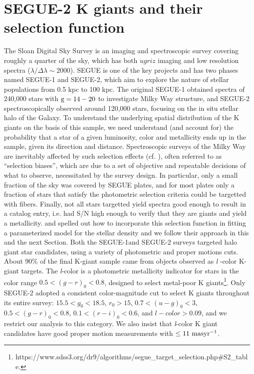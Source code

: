 \documentclass[12pt,preprint]{aastex}
\begin{document}
\section{SEGUE-2 K giants and their selection function}\label{sec:Sample_and_SelectionFunction}
The Sloan Digital Sky Survey\citep[SDSS;][]{York2000} is an imaging and spectroscopic survey covering roughly a quarter of the sky, which has both $ugriz$ imaging \citep{Fukugita1996, Gunn1998, Stoughton2002, Pier2003, Eisenstein2011} and low resolution spectra ($\lambda/\Delta \lambda \sim 2000$). SEGUE is one of
the key projects and has two phases named SEGUE-1 and SEGUE-2, which aim to explore the nature of stellar populations from 0.5 kpc to 100 kpc\citep[][and Rockosi et al. in prep.]{Yanny2009b}. The original SEGUE-1 obtained spectra of 240,000 stars with $\rm g=14-20$ to investigate Milky Way structure, and SEGUE-2 spectroscopically observed around 120,000 stars, focusing on the in situ stellar halo of the Galaxy.
To understand the underlying spatial distribution of the K giants on the basis of this sample, we need understand (and account for) the probability that a star of a given luminosity, color and metallicity ends up in the sample, given its direction and distance.
Spectroscopic surveys of the Milky Way are inevitably affected by such selection effects (cf. \citet{Rix2013}),
often referred to as ``selection biases'', which are due to a set of objective and repeatable decisions of what to observe,
necessitated by the survey design. In particular, only a small fraction of the sky was covered by SEGUE plates,
and for most plates only a fraction of stars that satisfy the photometric selection criteria could be targetted with fibers. Finally, not all stars targetted yield spectra good enough to result in a catalog entry, i.e. had S/N high enough to
verify that they are giants and yield a metallicity. \citet{Bovy2012} and \citet{Rix2013} spelled out how to incorporate this selection function in fitting a parameterized model for the stellar density and we follow their approach in this and the next Section.
Both the SEGUE-1and SEGUE-2 surveys targeted halo giant star candidates, using a variety of photometric and proper motions cuts. About 90\% of the final K-giant sample came from objects observed as \textit{l} -color K-giant targets.
The \textit{l}-color is a photometric metallicity indicator for stars in the color range $0.5 < (g-r)_0 < 0.8$, designed to select metal-poor K giants\footnote{https://www.sdss3.org/dr9/algorithms/segue\_target\_selection.php\#S2\_table.}.
Only SEGUE-2 adopted a consistent color-magnitude cut to select K giants throughout its entire survey: $15.5<g_0<18.5$, $r_0>15$, $0.7<(u-g)_0<3$, $0.5<(g-r)_0<0.8$, $0.1<(r-i)_0<0.6$, and $l-color>0.09$, and we restrict our analysis to this category. We also insist that \textit{l}-color K giant candidates have good proper motion measurements with $\le \rm 11~masyr^{-1}$.
\end{document}
